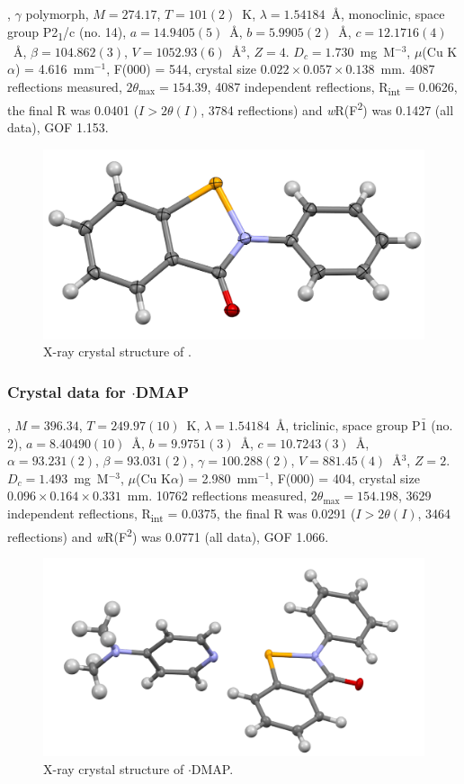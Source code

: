 \begin{refsection}
, $\gamma$ polymorph, $M=274.17$, $T=101(2)$~K, $\lambda=1.54184$~\AA, monoclinic, space group P2\textsubscript{1}/c (no. 14), $a = 14.9405(5)$~\AA, $b = 5.9905(2)$~\AA, $c = 12.1716(4)$~\AA, $\beta = 104.862(3)$\degree, $V = 1052.93(6)$~\AA$^{3}$, $Z = 4$. $D_{c}= 1.730$~mg~M$^{-3}$, $\mu$(Cu K$\alpha$) = 4.616~mm$^{-1}$, F(000) = 544, crystal size $0.022 \times 0.057 \times 0.138$~mm. 4087 reflections measured, $2\theta_{\max}=154.39$\degree, 4087 independent reflections, R\textsubscript{int} = 0.0626, the final R was 0.0401 ($I > 2\theta(I)$, 3784 reflections) and \textit{w}R(F\textsuperscript{2}) was 0.1427 (all data), GOF 1.153.

\begin{figure}
  \includegraphics[width=0.6\linewidth]{Figures/ebs-xtal.pdf}
  \caption{X-ray crystal structure of \texorpdfstring{}{C13 H9 N O Se}.}
\end{figure}

\subsubsection{Crystal data for \texorpdfstring{$ \cdot $DMAP}{C20 H19 N3 O Se}}
, $M=396.34$, $T=249.97(10)$~K, $\lambda=1.54184$~\AA, triclinic, space group P$\bar{1}$ (no. 2), $a = 8.40490(10)$~\AA, $b = 9.9751(3)$~\AA, $c = 10.7243(3)$~\AA, $\alpha = 93.231(2)$\degree, $\beta = 93.031(2)$\degree, $\gamma = 100.288(2)$\degree, $V = 881.45(4)$~\AA$^{3}$, $Z = 2$. $D_{c}= 1.493$~mg~M$^{-3}$, $\mu$(Cu K$\alpha$) = 2.980~mm$^{-1}$, F(000) = 404, crystal size $0.096 \times 0.164 \times 0.331$~mm. 10762 reflections measured, $2\theta_{\max}=154.198$\degree, 3629 independent reflections, R\textsubscript{int} = 0.0375, the final R was 0.0291 ($I > 2\theta(I)$, 3464 reflections) and \textit{w}R(F\textsuperscript{2}) was 0.0771 (all data), GOF 1.066.

\begin{figure}
  \includegraphics[width=0.6\linewidth]{Figures/ebs-dmap-xtal.pdf}
  \caption{X-ray crystal structure of \texorpdfstring{$ \cdot $DMAP}{C20 H19 N3 O Se}.}
\end{figure}


\end{refsection}
